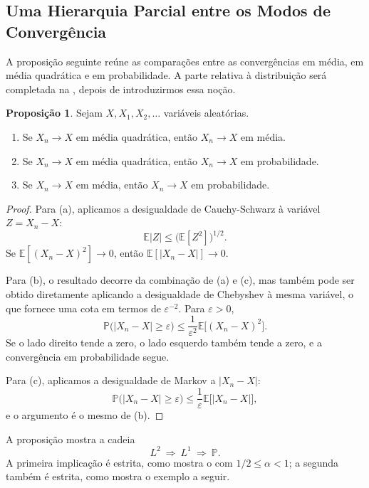\documentclass[12pt,portuguese]{article}
\theoremstyle{definition}
\newtheorem{proposition}[proposition]{Proposição}
\theoremstyle{plainexercise}
\theoremstyle{starredexercise}
\theoremstyle{definition}
\begin{document}
\subsection{Uma Hierarquia Parcial entre os Modos de Convergência}\label{subsec:medias-implicacoes}

A proposição seguinte reúne as comparações entre as convergências em média, em
média quadrática e em probabilidade. A parte relativa à distribuição será
completada na , depois de introduzirmos essa noção.

\begin{proposition}\label{prop:medias}
Sejam $X,X_1,X_2,\ldots$ variáveis aleatórias.
\begin{enumerate}
\item[(a)] Se $X_n\to X$ em média quadrática, então $X_n\to X$ em média.
\item[(b)] Se $X_n\to X$ em média quadrática, então
$X_n\to X$ em probabilidade.
\item[(c)] Se $X_n\to X$ em média, então $X_n\to X$ em probabilidade.
\end{enumerate}
\end{proposition}

\begin{proof}
Para (a), aplicamos a desigualdade de Cauchy-Schwarz à variável $Z=X_n-X$:
\[
\mathbb{E}|Z|
\leqslant
\bigl(\mathbb{E}[Z^2]\bigr)^{1/2}.
\]
Se $\mathbb{E}[(X_n-X)^2]\to0$, então $\mathbb{E}[|X_n-X|]\to0$.

Para (b), o resultado decorre da combinação de (a) e (c), mas também pode ser
obtido diretamente aplicando a desigualdade de Chebyshev à mesma variável, o
que fornece uma cota em termos de $\varepsilon^{-2}$. Para $\varepsilon>0$,
\[
\mathbb{P}\bigl(|X_n-X|\geqslant\varepsilon\bigr)
\leqslant
\frac{1}{\varepsilon^2}\mathbb{E}\bigl[(X_n-X)^2\bigr].
\]
Se o lado direito tende a zero, o lado esquerdo também tende a zero, e a
convergência em probabilidade segue.

Para (c), aplicamos a desigualdade de Markov a $|X_n-X|$:
\[
\mathbb{P}\bigl(|X_n-X|\geqslant\varepsilon\bigr)
\leqslant
\frac{1}{\varepsilon}\mathbb{E}\bigl[|X_n-X|\bigr],
\]
e o argumento é o mesmo de (b).
\end{proof}

A proposição mostra a cadeia
\[
L^2\ \Longrightarrow\ L^1\ \Longrightarrow\ \mathbb{P}.
\]
A primeira implicação é estrita, como mostra o
 com $1/2\leqslant\alpha<1$; a segunda também é
estrita, como mostra o exemplo a seguir.
\end{document}
